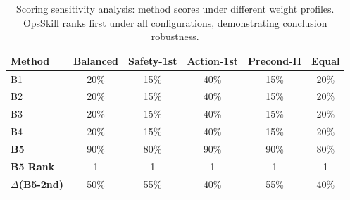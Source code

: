 \begin{table}[t]
\centering
\caption{Scoring sensitivity analysis: method scores under different weight profiles. OpsSkill ranks first under all configurations, demonstrating conclusion robustness.}
\label{tab:sensitivity}
\small
\begin{tabular}{lccccc}
\toprule
\textbf{Method} & \textbf{Balanced} & \textbf{Safety-1st} & \textbf{Action-1st} & \textbf{Precond-H} & \textbf{Equal} \\
\midrule
B1 & 20\% & 15\% & 40\% & 15\% & 20\% \\
B2 & 20\% & 15\% & 40\% & 15\% & 20\% \\
B3 & 20\% & 15\% & 40\% & 15\% & 20\% \\
B4 & 20\% & 15\% & 40\% & 15\% & 20\% \\
\textbf{B5} & 90\% & 80\% & 90\% & 90\% & 80\% \\
\midrule
\textbf{B5 Rank} & 1 & 1 & 1 & 1 & 1 \\
\textbf{$\Delta$(B5-2nd)} & 50\% & 55\% & 40\% & 55\% & 40\% \\
\bottomrule
\end{tabular}
\end{table}
